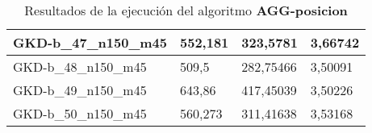 \begin{table}[!ht]
\begin{adjustbox}{height=12cm}
\begin{tabular}{|l|l|l|l|}
		GKD-b\_47\_n150\_m45 & 552,181 & 323,5781  & 3,66742   \\ \hline
		GKD-b\_48\_n150\_m45 & 509,5   & 282,75466 & 3,50091   \\ \hline
		GKD-b\_49\_n150\_m45 & 643,86  & 417,45039 & 3,50226   \\ \hline
		GKD-b\_50\_n150\_m45 & 560,273 & 311,41638 & 3,53168   \\ \hline
    \end{tabular}
    \end{adjustbox}
    \caption{Resultados de la ejecución del algoritmo \textbf{AGG-posicion}}
\end{table}

\pagebreak
